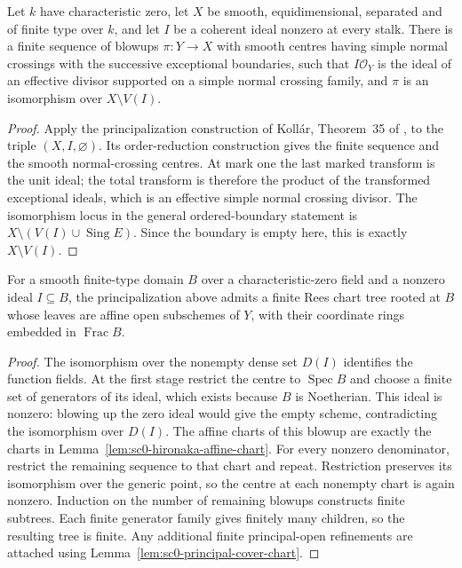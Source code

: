 \begin{theorem}\label{thm:sc0-algebraic-principalization}
\leanok
Let $k$ have characteristic zero, let $X$ be smooth, equidimensional, separated and of finite
type over $k$, and let $I$ be a coherent ideal nonzero at every stalk. There is a finite sequence
of blowups $\pi\colon Y\to X$ with smooth centres having simple normal crossings with the
successive exceptional boundaries, such that $I\mathcal O_Y$ is the ideal of an effective divisor
supported on a simple normal crossing family, and $\pi$ is an isomorphism over $X\setminus V(I)$.
\end{theorem}
\begin{proof}
Apply the principalization construction of Koll\'ar, Theorem~35 of \cite{Kollar07}, to the triple
$(X,I,\varnothing)$. Its order-reduction construction gives the finite sequence and the smooth
normal-crossing centres. At mark one the last marked transform is the unit ideal; the total
transform is therefore the product of the transformed exceptional ideals, which is an effective
simple normal crossing divisor. The isomorphism locus in the general ordered-boundary statement
is $X\setminus(V(I)\cup\operatorname{Sing}E)$. Since the boundary is empty here, this is exactly
$X\setminus V(I)$.
\end{proof}

\begin{lemma}\label{lem:sc0-bp-chart-tree}
\notready
{}
For a smooth finite-type domain $B$ over a characteristic-zero field and a nonzero ideal
$I\subseteq B$, the principalization above admits a finite Rees chart tree rooted at $B$ whose
leaves are affine open subschemes of $Y$, with their coordinate rings embedded in $\operatorname{Frac}B$.
\end{lemma}
\begin{proof}
The isomorphism over the nonempty dense set $D(I)$ identifies the function fields. At the first
stage restrict the centre to $\operatorname{Spec}B$ and choose a finite set of generators of its
ideal, which exists because $B$ is Noetherian. This ideal is nonzero: blowing up the zero ideal
would give the empty scheme, contradicting the isomorphism over $D(I)$. The affine charts of this
blowup are exactly the charts in Lemma~\ref{lem:sc0-hironaka-affine-chart}. For every nonzero
denominator, restrict the remaining sequence to that chart and repeat. Restriction preserves its
isomorphism over the generic point, so the centre at each nonempty chart is again nonzero.
Induction on the number of remaining blowups constructs finite subtrees. Each finite generator
family gives finitely many children, so the resulting tree is finite. Any additional finite
principal-open refinements are attached using Lemma~\ref{lem:sc0-principal-cover-chart}.
\end{proof}

